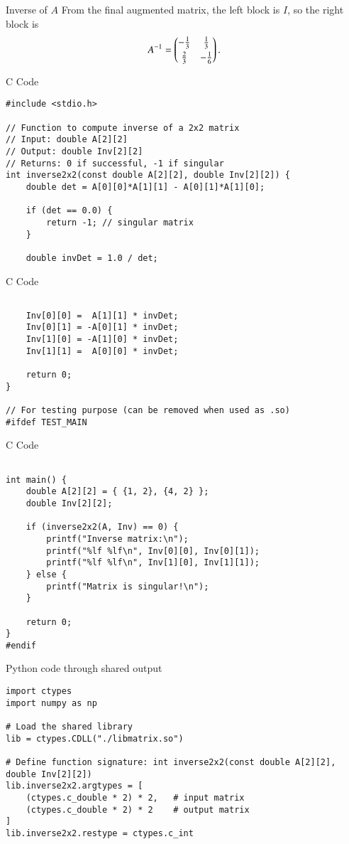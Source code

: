 \documentclass{beamer}
\begin{document}
\begin{frame}{Inverse of \(A\)}
From the final augmented matrix, the left block is \(I\), so the right block is
\[
A^{-1} = \begin{pmatrix}-\frac{1}{3} & \frac{1}{3} \\[1mm] \frac{2}{3} & -\frac{1}{6}\end{pmatrix}.
\]

\end{frame}
\begin{frame}[fragile]{C Code}
\begin{lstlisting}
#include <stdio.h>

// Function to compute inverse of a 2x2 matrix
// Input: double A[2][2]
// Output: double Inv[2][2]
// Returns: 0 if successful, -1 if singular
int inverse2x2(const double A[2][2], double Inv[2][2]) {
    double det = A[0][0]*A[1][1] - A[0][1]*A[1][0];

    if (det == 0.0) {
        return -1; // singular matrix
    }

    double invDet = 1.0 / det;
 \end{lstlisting}
\end{frame}
\begin{frame}[fragile]{C Code}
\begin{lstlisting}

    Inv[0][0] =  A[1][1] * invDet;
    Inv[0][1] = -A[0][1] * invDet;
    Inv[1][0] = -A[1][0] * invDet;
    Inv[1][1] =  A[0][0] * invDet;

    return 0;
}

// For testing purpose (can be removed when used as .so)
#ifdef TEST_MAIN
 \end{lstlisting}
\end{frame}
\begin{frame}[fragile]{C Code}
\begin{lstlisting}

int main() {
    double A[2][2] = { {1, 2}, {4, 2} };
    double Inv[2][2];

    if (inverse2x2(A, Inv) == 0) {
        printf("Inverse matrix:\n");
        printf("%lf %lf\n", Inv[0][0], Inv[0][1]);
        printf("%lf %lf\n", Inv[1][0], Inv[1][1]);
    } else {
        printf("Matrix is singular!\n");
    }

    return 0;
}
#endif

 \end{lstlisting}
\end{frame}
\begin{frame}[fragile]{Python code through shared output}
\begin{lstlisting}
import ctypes
import numpy as np

# Load the shared library
lib = ctypes.CDLL("./libmatrix.so")

# Define function signature: int inverse2x2(const double A[2][2], double Inv[2][2])
lib.inverse2x2.argtypes = [
    (ctypes.c_double * 2) * 2,   # input matrix
    (ctypes.c_double * 2) * 2    # output matrix
]
lib.inverse2x2.restype = ctypes.c_int
 \end{lstlisting}
\end{frame}
\end{document}
